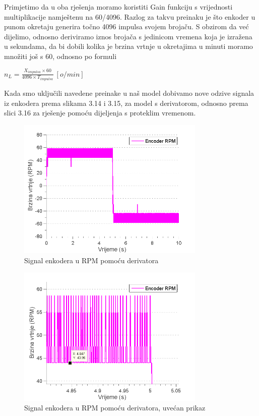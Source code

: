 \documentclass[12pt,a4paper]{article}
\begin{document}
Primjetimo da u oba rješenja moramo koristiti Gain funkciju s vrijednosti multiplikacije namještenu na 60/4096. Razlog za takvu preinaku je što enkoder u punom okretaju generira točno 4096 impulsa svojem brojaču. S obzirom da već dijelimo, odnosno deriviramo iznos brojača s jedinicom vremena koja je izražena u sekundama, da bi dobili kolika je brzina vrtnje u okretajima u minuti moramo množiti još s 60, odnosno po formuli

\begin{center}
$n_L=\frac{ X_{impulsa} \times 60}{ 4096 \times T_{impulsa}}\ [o/min]$
\end{center}

Kada smo uključili navedene preinake u naš model dobivamo nove odzive signala iz enkodera prema slikama 3.14 i 3.15,  za model s derivatorom, odnosno prema slici 3.16 za rješenje pomoću dijeljenja s proteklim vremenom.
\newpage

\begin{figure}[!h]
	\begin{center}
	\includegraphics[width=0.8\textwidth] {encoderRPM.png}
    \caption{Signal enkodera u RPM pomoću derivatora}
    \end{center}
\end{figure}

\begin{figure}[!h]
	\begin{center}
	\includegraphics[width=0.8\textwidth] {encoderRPMclose.png}
    \caption{Signal enkodera u RPM pomoću derivatora, uvećan prikaz}
    \end{center}
\end{figure}
\end{document}
